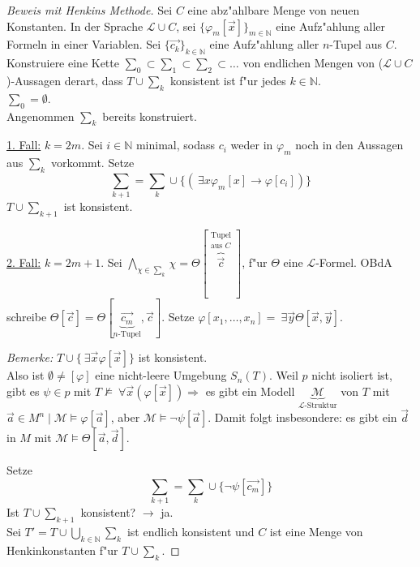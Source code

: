 \documentclass[a4paper,12pt,numbers=noenddot,parskip=full]{scrartcl}
\newcommand{\setN}{\mathbb{N}}
\newcommand{\Forall}{~\forall}
\newcommand{\Exists}{~\exists}
\newcommand{\scrL}{\mathcal{L}}
\theoremstyle{dotless}
\begin{document}
\begin{proof}[Beweis mit Henkins Methode]
	Sei $C$ eine abz"ahlbare Menge von neuen Konstanten. In der Sprache $\scrL \cup C$, sei $\{\varphi_m[\vec{x}] \}_{m \in \setN}$ eine Aufz"ahlung aller Formeln in einer Variablen. Sei $\{\vec{c_k} \}_{k \in \setN}$ eine Aufz"ahlung aller $n$-Tupel aus $C$. Konstruiere eine Kette $\sum_0 \subset \sum_1 \subset \sum_2 \subset \dots$ von endlichen Mengen von ($\scrL \cup C$)-Aussagen derart, dass $T \cup \sum_k$ konsistent ist f"ur jedes $k \in \setN$.\\
	$\sum_0 = \emptyset$.\\
	Angenommen $\sum_k$ bereits konstruiert.
	
	\underline{1. Fall:} $k=2m$. Sei $i \in \setN$ minimal, sodass $c_i$ weder in $\varphi_m$ noch in den Aussagen aus $\sum_k$ vorkommt. Setze 
	\begin{equation*}
		\sum_{k+1} = \sum_k \cup \{(\Exists x \varphi_m [x] \rightarrow \varphi[c_i]) \}
	\end{equation*}
	$T \cup \sum_{k+1}$ ist konsistent.
	
	\underline{2. Fall:} $k= 2m +1$. Sei $\bigwedge\limits_{\chi \in \sum_k} \chi = \Theta[\overbrace{\vec{c}}^{\substack{\text{Tupel}\\\text{aus } C}}]$, f"ur $\Theta$ eine $\scrL$-Formel. OBdA schreibe $\Theta[\vec{c}] = \Theta[\underbrace{\vec{c_m}}_{n\text{-Tupel}},\vec{c}]$. Setze $\varphi[x_1, \dots, x_n] =  \Exists \vec{y} \Theta[\vec{x}, \vec{y}]$.
	
	\emph{Bemerke:} $T \cup \{\Exists \vec{x} \varphi[\vec{x}] \}$ ist konsistent.\\
	Also ist $\emptyset \neq [\varphi]$ eine nicht-leere Umgebung $S_n(T)$. Weil $p$ nicht isoliert ist, gibt es $\psi \in p$ mit $T \not\models \Forall \vec{x} (\varphi[\vec{x}]) \Longrightarrow$ es gibt ein Modell $\underbrace{\mathcal{M}}_{\scrL \text{-Struktur}}$ von $T$ mit $\vec{a} \in M^n \mid \mathcal{M} \models \varphi[\vec{a}]$, aber $\mathcal{M} \models \lnot \psi[\vec{a}]$. Damit folgt insbesondere: es gibt ein $\vec{d}$ in $M$ mit $\mathcal{M} \models \Theta[\vec{a}, \vec{d}]$.
	
	Setze
	\begin{equation*}
		\sum_{k+1} = \sum_k \cup \{\lnot \psi[\vec{c_m}] \}
	\end{equation*}
	Ist $T \cup \sum_{k+1}$ konsistent? $\rightarrow$ ja.\\
	Sei $T' = T \cup \bigcup\limits_{k \in \setN} \sum_k$ ist endlich konsistent und $C$ ist eine Menge von Henkinkonstanten f"ur $T \cup \sum_k$.
	

\end{proof}
\end{document}
